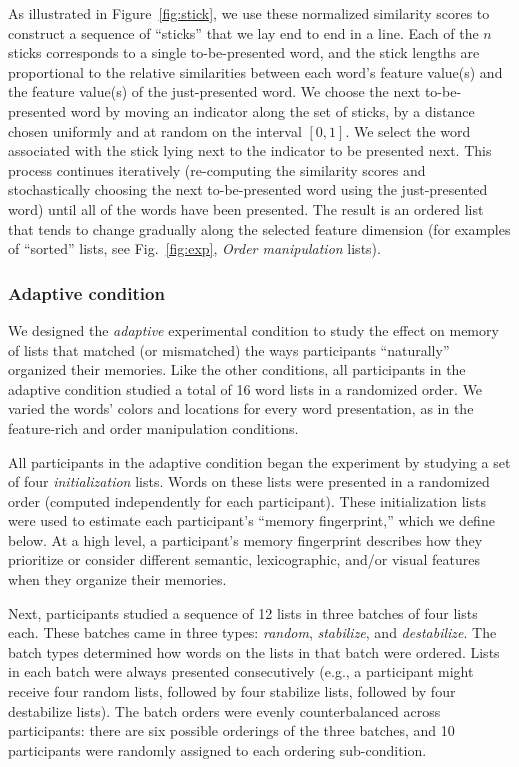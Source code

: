 \documentclass[11pt]{article}
\begin{document}
As illustrated in Figure~\ref{fig:stick}, we use these normalized similarity
scores to construct a sequence of ``sticks'' that we lay end to end in a line.
Each of the $n$ sticks corresponds to a single to-be-presented word, and the
stick lengths are proportional to the relative similarities between each word's
feature value(s) and the feature value(s) of the just-presented word. We choose
the next to-be-presented word by moving an indicator along the set of sticks,
by a distance chosen uniformly and at random on the interval $\left[0,
1\right]$. We select the word associated with the stick lying next to the
indicator to be presented next. This process continues iteratively
(re-computing the similarity scores and stochastically choosing the next
to-be-presented word using the just-presented word) until all of the words have
been presented. The result is an ordered list that tends to change gradually
along the selected feature dimension (for examples of ``sorted'' lists, see
Fig.~\ref{fig:exp}, \textit{Order manipulation} lists).

\subsubsection*{Adaptive condition}

We designed the \textit{adaptive} experimental condition to study the effect on
memory of lists that matched (or mismatched) the ways participants
``naturally'' organized their memories. Like the other conditions, all
participants in the adaptive condition studied a total of 16 word lists in a
randomized order. We varied the words' colors and locations for every word
presentation, as in the feature-rich and order manipulation conditions.

All participants in the adaptive condition began the experiment by studying a
set of four \textit{initialization} lists. Words on these lists
were presented in a randomized order (computed independently for each
participant). These initialization lists were used to estimate each
participant's ``memory fingerprint,'' which we define below. At a high level, a
participant's memory fingerprint describes how they prioritize or consider
different semantic, lexicographic, and/or visual features when they organize
their memories.

Next, participants studied a sequence of 12 lists in three batches of four
lists each. These batches came in three types: \textit{random},
\textit{stabilize}, and \textit{destabilize}. The batch types determined how
words on the lists in that batch were ordered. Lists in each batch were always
presented consecutively (e.g., a participant might receive four random lists,
followed by four stabilize lists, followed by four destabilize lists). The
batch orders were evenly counterbalanced across participants: there are six
possible orderings of the three batches, and 10 participants were randomly
assigned to each ordering sub-condition.
\end{document}
